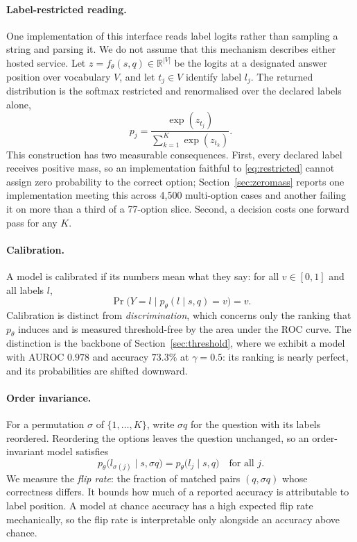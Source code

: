 \paragraph{Label-restricted reading.} One implementation of this interface reads
label logits rather than sampling a string and parsing it. We do not assume
that this mechanism describes either hosted service. Let $z = f_\theta(s,q) \in \mathbb{R}^{|V|}$ be the logits at
a designated answer position over vocabulary $V$, and let $t_j \in V$ identify
label $l_j$. The returned distribution is the softmax restricted and renormalised
over the declared labels alone,
\begin{equation}
  p_j = \frac{\exp(z_{t_j})}{\sum_{k=1}^{K} \exp(z_{t_k})}.
  \label{eq:restricted}
\end{equation}
This construction has two measurable consequences. First, every declared label
receives positive mass, so an implementation faithful to \eqref{eq:restricted}
cannot assign zero probability to the correct option;
Section~\ref{sec:zeromass} reports one implementation meeting this across
4{,}500 multi-option cases and another failing it on more than a third of a
77-option slice. Second, a decision costs one forward pass for any $K$.

\paragraph{Calibration.} A model is calibrated if its numbers mean what they say:
for all $v \in [0,1]$ and all labels $l$,
\begin{equation}
  \Pr\big(Y = l \;\big|\; p_\theta(l \mid s,q) = v\big) = v.
  \label{eq:calibration}
\end{equation}
Calibration is distinct from \emph{discrimination}, which concerns only the
ranking that $p_\theta$ induces and is measured threshold-free by the area under
the ROC curve. The distinction is the backbone of Section~\ref{sec:threshold},
where we exhibit a model with AUROC $0.978$ and accuracy $73.3\%$ at
$\gamma = 0.5$: its ranking is nearly perfect, and its probabilities are
shifted downward.

\paragraph{Order invariance.} For a permutation $\sigma$ of $\{1,\dots,K\}$, write
$\sigma q$ for the question with its labels reordered. Reordering the options
leaves the question unchanged, so an order-invariant model satisfies
\begin{equation}
  p_\theta\big(l_{\sigma(j)} \mid s, \sigma q\big) = p_\theta\big(l_j \mid s, q\big)
  \quad \text{for all } j.
  \label{eq:orderinv}
\end{equation}
We measure the \emph{flip rate}: the fraction of matched pairs $(q, \sigma q)$
whose correctness differs. It bounds how much of a reported accuracy is
attributable to label position. A model at chance accuracy has a high expected
flip rate mechanically, so the flip rate is interpretable only alongside an
accuracy above chance.


